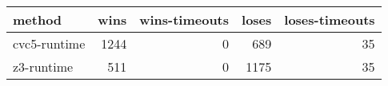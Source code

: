 \begin{tabular}{lrrrr}
\hline
 method       &   wins &   wins-timeouts &   loses &   loses-timeouts \\
\hline
 cvc5-runtime &   1244 &               0 &     689 &               35 \\
 z3-runtime   &    511 &               0 &    1175 &               35 \\
\hline
\end{tabular}
